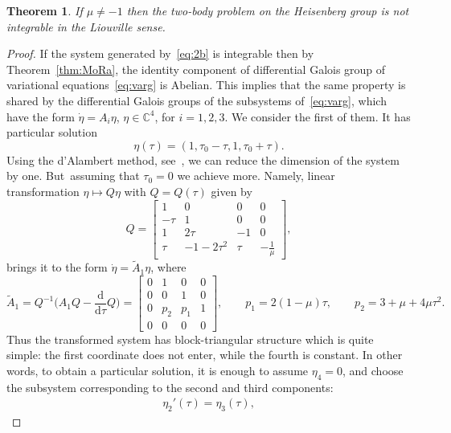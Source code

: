 \documentclass[pdftex]{sigma}
\numberwithin{equation}{section}
\newtheorem{Theorem}{Theorem}[section]
\begin{document}
\begin{Theorem} %
 If $\mu\neq -1$ then the two-body problem on the Heisenberg group is
 not integrable in the Liouville sense.
\end{Theorem}
\begin{proof}
 If the system generated by~\eqref{eq:2b} is integrable then by
 Theorem~\ref{thm:MoRa}, the identity component of differential
 Galois group of variational equations~\eqref{eq:varg} is Abelian.
 This implies that the same property is shared by the differential Galois groups
 of the subsystems of~\eqref{eq:varg}, which have the form
 $\dot\eta=A_i \eta$, $\eta\in\mathbb{C}^4$, for $i=1,2,3$. We
 consider the first of them. It has particular solution
 \begin{equation}
 \label{par}
 \eta(\tau)=(1, \tau_0-\tau,1, \tau_0+\tau).
 \end{equation}
 Using the d'Alambert method, see~\cite{Walter}, we can reduce the
 dimension of the system by one. But~assuming that $\tau_0=0$ we
 achieve more. Namely, linear transformation $\eta\mapsto Q\eta$ with
 $Q=Q(\tau)$ given by
 \begin{equation*}
 Q = \begin{bmatrix}
 1 & 0 & 0 & 0\\
 -\tau & 1 & 0 & 0\\
 1 & 2\tau & -1 & 0\\
 \tau & -1-2\tau^2 & \tau & -\frac{1}{\mu}
 \end{bmatrix}\!,
 \end{equation*}
 brings it to the form $\dot{\eta}=\widetilde{A}_1\eta$, where
 \begin{equation*}
 \widetilde{A}_1 =Q^{-1}\bigg(A_1 Q -\frac{\mathrm{d}}{\mathrm{d}\tau}Q\bigg) = \begin{bmatrix}
 0 & 1 & 0 & 0\\
 0 & 0 & 1 & 0\\
 0 & p_2 & p_1 & 1\\
 0 & 0 & 0 & 0
 \end{bmatrix}\!,\qquad p_1 = 2(1-\mu)\tau,\qquad p_2 =
 3+\mu+4\mu\tau^2.
 \end{equation*}
 Thus the transformed system has block-triangular structure which is
 quite simple: the first coordinate does not enter, while the fourth
 is constant. In other words, to obtain a particular solution, it is
 enough to assume $\eta_4=0$, and choose the subsystem corresponding to the second and third
 components:
 \begin{gather*}
 \eta_2'(\tau) = \eta_3(\tau),

\end{gather*}
\end{proof}
\end{document}
